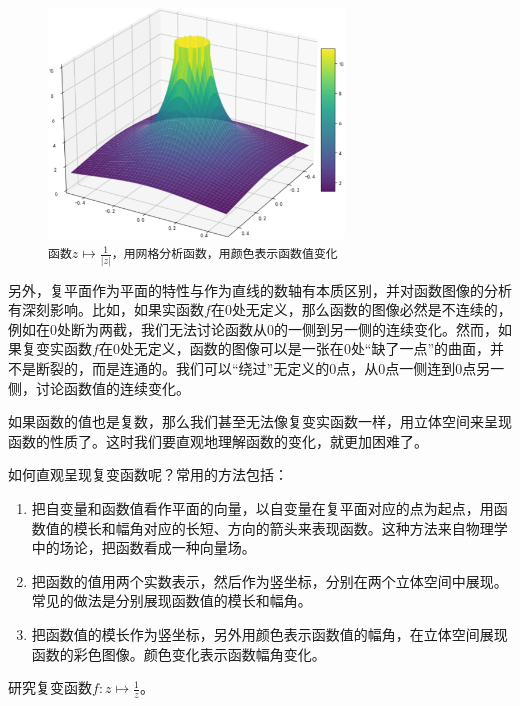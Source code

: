 \documentclass[12pt,UTF8]{ctexbook}
\begin{document}
\begin{figure}[h] %
    \centering
    \includegraphics[width=0.7\textwidth]{tu/复变倒数1.png}
    \caption*{\texttt{函数}$z\mapsto\frac{1}{|z|}$\texttt{，用网格分析函数，用颜色表示函数值变化}}
\end{figure}

另外，复平面作为平面的特性与作为直线的数轴有本质区别，并对函数图像的分析有深刻影响。比如，如果实函数$f$在$0$处无定义，那么函数的图像必然是不连续的，例如在$0$处断为两截，我们无法讨论函数从$0$的一侧到另一侧的连续变化。然而，如果复变实函数$f$在$0$处无定义，函数的图像可以是一张在$0$处“缺了一点”的曲面，并不是断裂的，而是连通的。我们可以“绕过”无定义的$0$点，从$0$点一侧连到$0$点另一侧，讨论函数值的连续变化。

如果函数的值也是复数，那么我们甚至无法像复变实函数一样，用立体空间来呈现函数的性质了。这时我们要直观地理解函数的变化，就更加困难了。

如何直观呈现复变函数呢？常用的方法包括：
\begin{enumerate}
    \item 把自变量和函数值看作平面的向量，以自变量在复平面对应的点为起点，用函数值的模长和幅角对应的长短、方向的箭头来表现函数。这种方法来自物理学中的场论，把函数看成一种向量场。
    \item 把函数的值用两个实数表示，然后作为竖坐标，分别在两个立体空间中展现。常见的做法是分别展现函数值的模长和幅角。
    \item 把函数值的模长作为竖坐标，另外用颜色表示函数值的幅角，在立体空间展现函数的彩色图像。颜色变化表示函数幅角变化。
\end{enumerate}

\begin{et}
    研究复变函数$\displaystyle f: z \mapsto \frac{1}{z}$。
\end{et}
\end{document}
